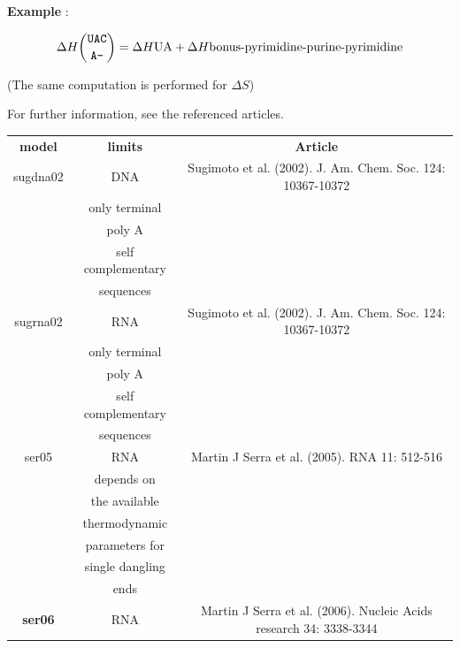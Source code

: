 \documentclass{article}
\begin{document}
\textbf{Example} :

\begin{multline*}
\Delta H {\mbox{\texttt{UAC}} \choose \mbox{\texttt{A--}}} =
\Delta H {\mbox{UA}} +
\Delta H {\mbox{bonus-pyrimidine-purine-pyrimidine}} \\
\end{multline*}

       (The same computation is performed for $\Delta S$)

For further information, see the referenced articles.

\begin{table}[h]
\begin{tabular}[h]{| c | c | c |}
\textbf{model} & \textbf{limits} & \textbf{Article} \\
sugdna02 & DNA & Sugimoto et al. (2002). J. Am. Chem. Soc. 124: 10367-10372 \\
 & only terminal & \\
 & poly A & \\
 & self complementary & \\
 & sequences & \\
sugrna02 & RNA & Sugimoto et al. (2002). J. Am. Chem. Soc. 124: 10367-10372 \\
 & only terminal & \\
 & poly A & \\
 & self complementary & \\
 & sequences & \\
ser05 & RNA & Martin J Serra et al. (2005). RNA 11: 512-516 \\
 & depends on & \\
 & the available & \\
 & thermodynamic & \\
 & parameters for & \\
 & single dangling & \\
 & ends & \\
\textbf{ser06} & RNA & Martin J Serra et al. (2006). Nucleic Acids research 34: 3338-3344 \\
\end{tabular}
\end{table}
\end{document}
